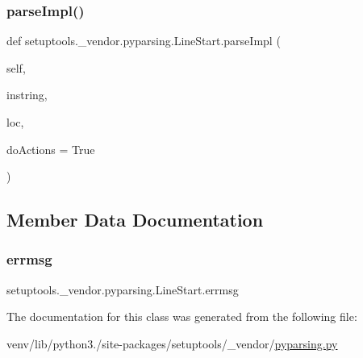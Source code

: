 \subsubsection{\texorpdfstring{parse\+Impl()}{parseImpl()}}
{\footnotesize\ttfamily def setuptools.\+\_\+vendor.\+pyparsing.\+Line\+Start.\+parse\+Impl (\begin{DoxyParamCaption}\item[{}]{self,  }\item[{}]{instring,  }\item[{}]{loc,  }\item[{}]{do\+Actions = {\ttfamily True} }\end{DoxyParamCaption})}



\subsection{Member Data Documentation}
\mbox{\label{classsetuptools_1_1__vendor_1_1pyparsing_1_1LineStart_a24b64fc4f52322b55b5b9acaec9b3d87}} 
\subsubsection{\texorpdfstring{errmsg}{errmsg}}
{\footnotesize\ttfamily setuptools.\+\_\+vendor.\+pyparsing.\+Line\+Start.\+errmsg}



The documentation for this class was generated from the following file\+:\begin{DoxyCompactItemize}
\item 
venv/lib/python3./site-\/packages/setuptools/\+\_\+vendor/\hyperlink{setuptools_2__vendor_2pyparsing_8py}{pyparsing.\+py}\end{DoxyCompactItemize}
